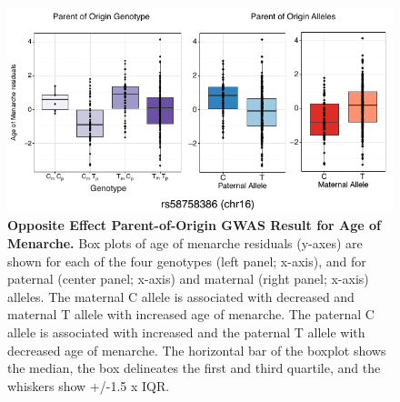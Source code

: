 \begin{figure}[!htb]
\centering \includegraphics[width=5in]{img/ch02/fig-03-menarche_oegwas.pdf}
\caption[Opposite Effect Parent-of-Origin GWAS Result for Age of Menarche.]{\textbf{Opposite Effect Parent-of-Origin GWAS Result for Age of Menarche.}  Box plots of age of menarche residuals (y-axes) are shown for each of the four genotypes (left panel; x-axis), and for paternal (center panel; x-axis) and maternal (right panel; x-axis) alleles. The maternal C allele is associated with decreased and maternal T allele with increased age of menarche. The paternal C allele is associated with increased and the paternal T allele with decreased age of menarche. The horizontal bar of the boxplot shows the median, the box delineates the first and third quartile, and the whiskers show +/-1.5 x IQR.}
\label{fig:menarche_oegwas}
\end{figure}

